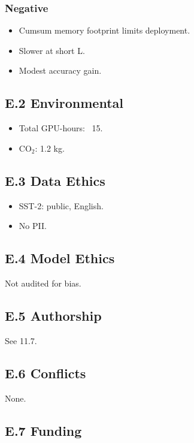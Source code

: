 \subsubsection{Negative}
\begin{itemize}
\item Cumsum memory footprint limits deployment.
\item Slower at short L.
\item Modest accuracy gain.

\end{itemize}
\subsection{E.2 Environmental}

\begin{itemize}
\item Total GPU-hours: ~15.
\item CO$_2$: 1.2 kg.

\end{itemize}
\subsection{E.3 Data Ethics}

\begin{itemize}
\item SST-2: public, English.
\item No PII.

\end{itemize}
\subsection{E.4 Model Ethics}

Not audited for bias.

\subsection{E.5 Authorship}

See  11.7.

\subsection{E.6 Conflicts}

None.

\subsection{E.7 Funding}

